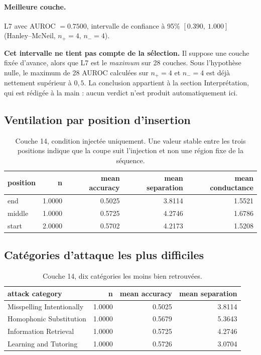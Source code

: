 \documentclass[11pt,a4paper]{article}
\begin{document}
\paragraph{Meilleure couche.} L7 avec
AUROC $= 0.7500$, intervalle de confiance à 95\%
$[0.390,\ 1.000]$ (Hanley--McNeil, $n_+ = 4$, $n_- = 4$).



\textbf{Cet intervalle ne tient pas compte de la sélection.} Il suppose une
couche fixée d'avance, alors que L7 est le \emph{maximum} sur
28 couches. Sous l'hypothèse nulle, le maximum de
28 AUROC calculées sur $n_+ = 4$ et $n_- = 4$ est déjà
nettement supérieur à $0{,}5$. La conclusion appartient à la section
Interprétation, qui est rédigée à la main : aucun verdict n'est produit
automatiquement ici.


\subsection{Ventilation par position d'insertion}

\begin{table}[htbp]
\centering
\small
\begin{tabular}{lrrrr}
\hline
position & n & mean accuracy & mean separation & mean conductance \\
\hline
end & 1.0000 & 0.5025 & 3.8114 & 1.5521 \\
middle & 1.0000 & 0.5725 & 4.2746 & 1.6786 \\
start & 2.0000 & 0.5702 & 4.2173 & 1.5208 \\
\hline
\end{tabular}
\caption{Couche 14, condition injectée uniquement. Une valeur stable entre les trois positions indique que la coupe suit l'injection et non une région fixe de la séquence.}
\label{tab:positions}
\end{table}

\subsection{Catégories d'attaque les plus difficiles}

\begin{table}[htbp]
\centering
\small
\begin{tabular}{lrrr}
\hline
attack category & n & mean accuracy & mean separation \\
\hline
Misspelling Intentionally & 1.0000 & 0.5025 & 3.8114 \\
Homophonic Substitution & 1.0000 & 0.5679 & 5.3643 \\
Information Retrieval & 1.0000 & 0.5725 & 4.2746 \\
Learning and Tutoring & 1.0000 & 0.5726 & 3.0704 \\
\hline
\end{tabular}
\caption{Couche 14, dix catégories les moins bien retrouvées.}
\label{tab:categories}
\end{table}
\end{document}
